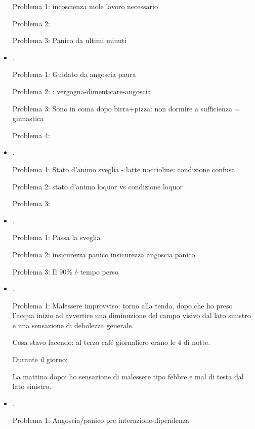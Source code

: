 \begin{itemize}
Problema 1: incoscienza mole lavoro necessario

Problema 2: 

Problema 3: Panico da ultimi minuti

\item {}.

Problema 1: Guidato da angoscia paura

Problema 2: : vergogna-dimenticare-angoscia.

Problema 3: Sono in coma dopo birra+pizza: non dormire a sufficienza = ginnastica

Problema 4: 

\item {}.

Problema 1: Stato d'animo sveglia - latte noccioline: condizione confusa

Problema 2: stato d'animo loquor vs condizione loquor

Problema 3: 

\item {}.

Problema 1: Passa la sveglia

Problema 2: insicurezza panico insicurezza angoscia panico

Problema 3: Il $90\%$ \'e tempo perso

\item {}.

Problema 1: Malessere improvviso: torno alla tenda, dopo che ho preso l'acqua inizio ad avvertire una diminuzione del campo visivo dal lato sinistro e una sensazione di debolezza generale.

Cosa stavo facendo: al terzo caf\'e giornaliero erano le 4 di notte.

Durante il giorno:

La mattina dopo: ho sensazione di malessere tipo febbre e mal di testa dal lato sinistro.

\item {}.

Problema 1: Angoscia/panico pre interazione-dipendenza


\end{itemize}
